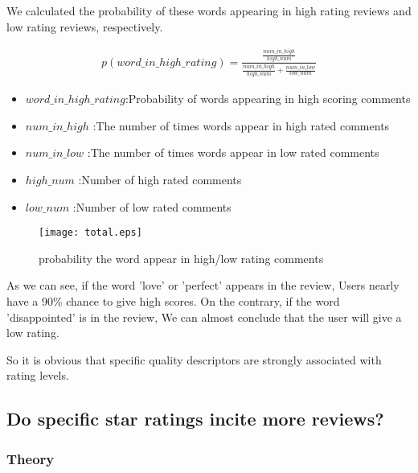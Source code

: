 \documentclass{mcmthesis}
\begin{document}
We calculated the probability of these words appearing in high rating reviews and low rating reviews, respectively.

\begin{align}
p(word\_in\_high\_rating)=\frac{\frac{num\_in\_high}{high\_num}}
{\frac{num\_in\_high}{high\_num}+\frac{num\_in\_low}{low\_num}}
\end{align}
\begin{flushleft}
	\begin{itemize}
		\item  $word\_in\_high\_rating$:Probability of words appearing in high scoring comments 
		\item	$num\_in\_high$ :The number of times words appear in high rated comments
		\item $num\_in\_low$ :The number of times words appear in low rated comments
		\item $high\_num$ :Number of high rated comments
		\item $low\_num$ :Number of low rated comments
	\end{itemize}
\end{flushleft}

\begin{figure}[H]
	\begin{minipage}[t]{1\textwidth}
		\centering
		\texttt{[image: total.eps]}
		\caption{probability the word appear in high/low rating comments\label{fig:1}}
	\end{minipage}
\end{figure}
\begin{flushleft}
	As we can see, if the word 'love' or 'perfect' appears in the review, Users nearly have a 90\% chance to give high scores. On the contrary, if the word 'disappointed' is in the review, We can almost conclude that the user will give a low rating.
\end{flushleft}
So it is obvious that specific quality descriptors are strongly associated with rating levels.

\subsection{Do specific star ratings incite more reviews? }
\subsubsection{Theory}
\end{document}
